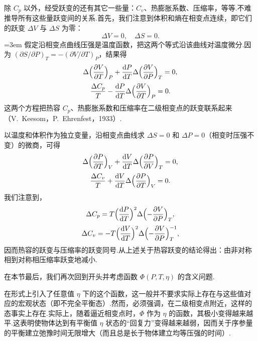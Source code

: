 除 $C_p$ 以外，经受跃变的还有其它一些量：$C_v$、热膨胀系数、压缩率，等等.不难推导所有这些量跃变间的关系.首先，我们注意到体积和熵在相变点连续，即它们的跃变 $\Delta V$ 与 $\Delta S$ 为零：
\begin{equation*}
  \Delta V=0,\quad\Delta S=0.
\end{equation*}
{\emergencystretch=3em
假定沿相变点曲线压强是温度函数，把这两个等式沿该曲线对温度微分.因为 $(\partial S/\partial P)_T=\allowbreak-(\partial V/\partial T)_P$，结果得
\begin{equation}
  \Delta\Bigl(\frac{\partial V}{\partial T}\Bigr)_P
  +\frac{\mathrm{d}P}{\mathrm{d}T}\Delta\Bigl(\frac{\partial V}{\partial P}\Bigr)_T=0,
\end{equation}
\begin{equation}
  \frac{\Delta C_p}{T}-\frac{\mathrm{d}P}{\mathrm{d}T}
  \Delta\Bigl(\frac{\partial V}{\partial T}\Bigr)_P=0.
\end{equation}
}
这两个方程把热容 $C_p$、热膨胀系数和压缩率在二级相变点的跃变联系起来（V.~Keesom，P.~Ehrenfest，1933）.

以温度和体积作为独立变量，沿相变点曲线求 $\Delta S=0$ 和 $\Delta P=0$（相变时压强不变）的微商，可得
\begin{equation}
  \Delta\Bigl(\frac{\partial P}{\partial T}\Bigr)_V
  +\frac{\mathrm{d}V}{\mathrm{d}T}\Delta\Bigl(\frac{\partial P}{\partial V}\Bigr)_T=0,
\end{equation}
\begin{equation}
  \frac{\Delta C_v}{T}+\frac{\mathrm{d}V}{\mathrm{d}T}
  \Delta\Bigl(\frac{\partial P}{\partial T}\Bigr)_V=0.
\end{equation}
我们注意到，
\begin{equation}
  \Delta C_p=T\Bigl(\frac{\mathrm{d}P}{\mathrm{d}T}\Bigr)^{2}
  \Delta\Bigl(-\frac{\partial V}{\partial P}\Bigr)_T,
\end{equation}
\begin{equation}
  \Delta C_v=-T\Bigl(\frac{\mathrm{d}V}{\mathrm{d}T}\Bigr)^{2}
  \Delta\Bigl(-\frac{\partial V}{\partial P}\Bigr)_T^{-1},
\end{equation}
因而热容的跃变与压缩率的跃变同号.从上述关于热容跃变的结论得出：由非对称相到对称相压缩率跃变地减小.

在本节最后，我们再次回到开头并考虑函数 $\Phi(P,T,\eta)$ 的含义问题.

在形式上引入了任意值 $\eta$ 下的这个函数，这一般并不要求实际上存在与这些值对应的宏观状态（即不完全平衡态）.然而，必须强调，在二级相变点附近，这样的态事实上存在.实际上，随着逼近相变点时，$\Phi$ 作为 $\eta$ 的函数，其极小变得越来越平.这表明使物体达到有平衡值 $\eta$ 状态的“回复力”变得越来越弱，因而关于序参量的平衡建立弛豫时间无限增大（而且总是长于物体建立均等压强的时间）.

